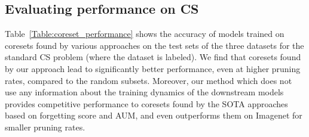 \subsection{Evaluating performance on CS}
Table~\ref{Table:coreset_performance} shows the accuracy of models trained on coresets found by various approaches on the test sets of the three datasets for the standard CS problem (where the dataset is labeled). 
We find that coresets found by our approach lead to significantly better performance, even at higher pruning rates, compared to the random subsets.
Moreover, our method which does not use any information about the training dynamics of the downstream models provides competitive performance to coresets found by the SOTA approaches based on forgetting score and AUM, and even outperforms them on Imagenet for smaller pruning rates. 






